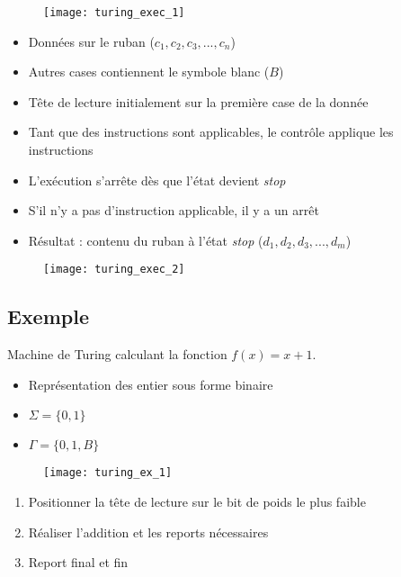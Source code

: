 \begin{figure}[H]
    \centering
    \texttt{[image: turing\_exec\_1]}
\end{figure}
\begin{itemize}
\item Données sur le ruban ($c_1, c_2, c_3, ..., c_n$)
\item Autres cases contiennent le symbole blanc ($B$)
\item Tête de lecture initialement sur la première case de la donnée
\item Tant que des instructions sont applicables, le contrôle applique les instructions
\item L'exécution s'arrête dès que l'état devient \textit{stop}
\item S'il n'y a pas d'instruction applicable, il y a un arrêt
\item Résultat : contenu du ruban à l'état \textit{stop} ($d_1, d_2, d_3, ..., d_m$)
\end{itemize}
\begin{figure}[H]
    \centering
    \texttt{[image: turing\_exec\_2]}
\end{figure}

\subsection{Exemple}

Machine de Turing calculant la fonction $f(x) = x+1$.
\begin{itemize}
\item Représentation des entier sous forme binaire
\item $\Sigma = \{0, 1\}$
\item $\Gamma = \{0, 1, B\}$
\end{itemize}
\begin{figure}[H]
    \centering
    \texttt{[image: turing\_ex\_1]}
\end{figure}
\begin{enumerate}
\item Positionner la tête de lecture sur le bit de poids le plus faible
\item Réaliser l'addition et les reports nécessaires
\item Report final et fin
\end{enumerate}

